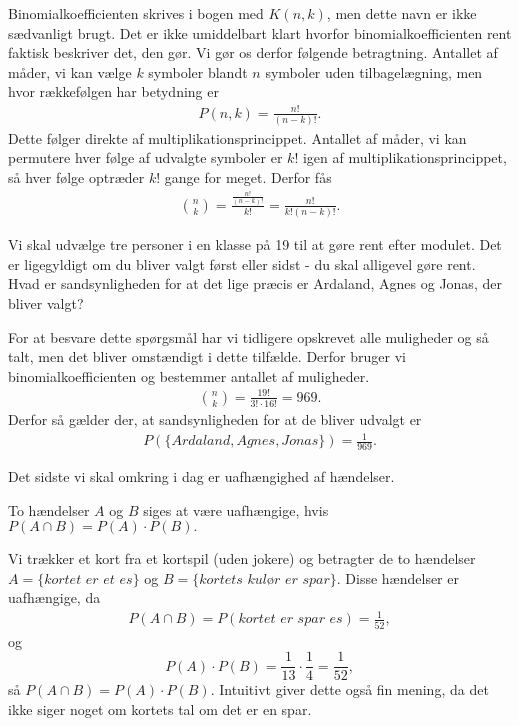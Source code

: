 Binomialkoefficienten skrives i bogen med $K(n,k)$, men dette navn er ikke sædvanligt brugt.
Det er ikke umiddelbart klart hvorfor binomialkoefficienten rent faktisk beskriver det, den gør. Vi gør os derfor følgende betragtning. Antallet af måder, vi kan vælge $k$ symboler blandt $n$ symboler uden tilbagelægning, men hvor rækkefølgen har betydning er 
\begin{align*}
P(n,k) = \frac{n!}{(n-k)!}.
\end{align*}
Dette følger direkte af multiplikationsprincippet.
Antallet af måder, vi kan permutere hver følge af udvalgte symboler er $k!$ igen af multiplikationsprincippet, så hver følge optræder $k!$ gange for meget. Derfor fås 
\begin{align*}
\binom{n}{k} = \frac{\frac{n!}{(n-k)!}}{k!} =\frac{n!}{k!(n-k)!} .
\end{align*}
\begin{exa}
Vi skal udvælge tre personer i en klasse på 19 til at gøre rent efter modulet. Det er ligegyldigt om du bliver valgt først eller sidst - du skal alligevel gøre rent. Hvad er sandsynligheden for at det lige præcis er Ardaland, Agnes og Jonas, der bliver valgt? 

For at besvare dette spørgsmål har vi tidligere opskrevet alle muligheder og så talt, men det bliver omstændigt i dette tilfælde. Derfor bruger vi binomialkoefficienten og bestemmer antallet af muligheder.
\begin{align*}
\binom{n}{k} = \frac{19!}{3!\cdot 16!} = 969.
\end{align*}
Derfor så gælder der, at sandsynligheden for at de bliver udvalgt er
\begin{align*}
P(\{Ardaland,Agnes,Jonas\}) = \frac{1}{969}.
\end{align*}
\end{exa}
Det sidste vi skal omkring i dag er uafhængighed af hændelser.
\begin{defn}
To hændelser $A$ og $B$ siges at være uafhængige, hvis $P(A \cap B) = P(A)\cdot P(B).$
\end{defn}
\begin{exa}
Vi trækker et kort fra et kortspil (uden jokere) og betragter de to hændelser $A= \{\textit{kortet er et es}\}$ og $B=\{\textit{kortets kulør er spar}\}$. Disse hændelser er uafhængige, da 
\begin{align*}
P(A \cap B) = P({\textit{kortet er spar es}}) = \frac{1}{52},
\end{align*}
og 
\[
P(A)\cdot P(B) = \frac{1}{13} \cdot \frac{1}{4} = \frac{1}{52}, 
\]
så $P(A\cap B) = P(A)\cdot P(B).$
Intuitivt giver dette også fin mening, da det ikke siger noget om kortets tal om det er en spar.
\end{exa}
